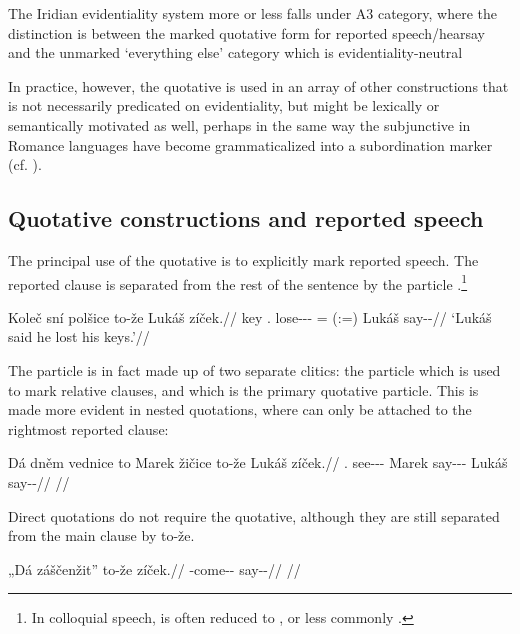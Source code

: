 The Iridian evidentiality system more or less falls under
 A3 category, where the distinction is between the
marked quotative form for reported speech/hearsay and the unmarked ‘everything
else’ category which is evidentiality-neutral


In practice, however, the quotative is used in an array of other constructions
that is not necessarily predicated on evidentiality, but might be lexically or
semantically motivated as well, perhaps in the same way the subjunctive in
Romance languages have become grammaticalized into a subordination marker (cf.
\cite{poplacketal}).

\subsection{Quotative constructions and reported
speech}\label{sec:quotative-const}

The principal use of the quotative is to explicitly mark reported speech. The
reported clause is separated from the rest of the sentence by the particle
.\footnote{In colloquial speech,  is often reduced to
, or less commonly .}

\pex
  \begingl
    \gla Koleč sní polšice to-že Lukáš zíček.//
    \glb key \Refl{}.\Acc{} lose-\Av{}-\Pf{}-\Quot{} {\Rel{}=\Quot{} (:=\Qp{})} Lukáš say-\Av{}-\Pf{}//
    \glft ‘Lukáš said he lost his keys.’//
  \endgl
\xe

The particle  is in fact made up of two separate clitics: the particle  which is used to mark relative clauses, and  which is the primary quotative particle. This is made more evident in nested quotations, where  can only be attached to the rightmost reported clause:

\pex
  \begingl
    \gla Dá dněm vednice to Marek žičice to-že Lukáš zíček.//
    \glb \First{}\Sg{} \Dem{}.\Agt{} see-\Pv{}-\Pf{}-\Quot{} \Rel{} Marek say-\Av{}-\Pf{}-\Quot{} \Qp{} Lukáš say-\Av{}-\Pf{}//
    \glft {}//
  \endgl
\xe


Direct quotations do not require the quotative, although they are still
separated from the main clause by to-že.

\pex
  \begingl
    \gla „Dá záščenžit” to-že zíček.//
    \glb \First{}\Sg{} \Neg{}-come-\Av{}-\SupP{} \Qp{} say-\Av{}-\Pf{}//
    \glft {}//
  \endgl
\xe



